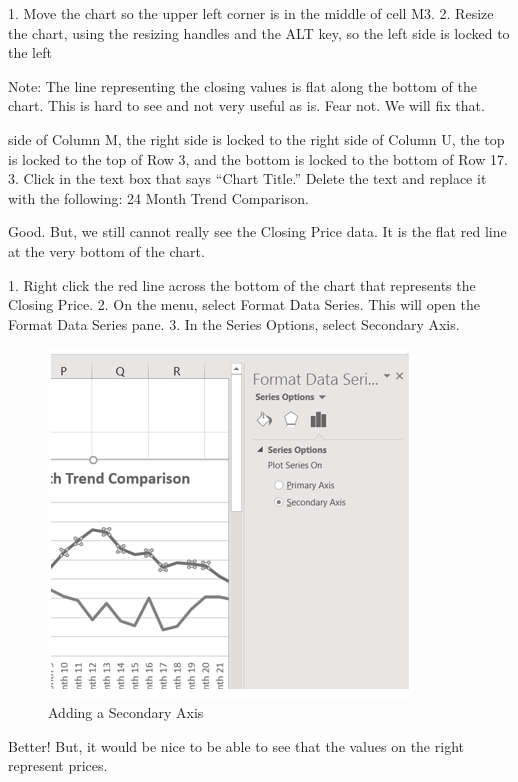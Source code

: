 1. Move the chart so the upper left corner is in the middle of cell M3.
2. Resize the chart, using the resizing handles and the ALT key, so the left side is locked to the left




Note: The line representing the closing values is flat along the bottom of the chart. This is hard to see
and not very useful as is. Fear not. We will fix that.





side of Column M, the right side is locked to the right side of Column U, the top is locked to the
top of Row 3, and the bottom is locked to the bottom of Row 17.
3. Click in the text box that says “Chart Title.” Delete the text and replace it with the following: 24
Month Trend Comparison.

Good. But, we still cannot really see the Closing Price data. It is the flat red line at the very bottom of
the chart.

1. Right click the red line across the bottom of the chart that represents the Closing Price.
2. On the menu, select Format Data Series. This will open the Format Data Series pane.
3. In the Series Options, select Secondary Axis.


\begin{figure}[H]
	\centering
	\includegraphics[width=\maxwidth{.95\linewidth}]{gfx/ch04_fig08}
	\caption{Adding a Secondary Axis}
	\label{04:fig08}
\end{figure}





Better! But, it would be nice to be able to see that the values on the right represent prices.

